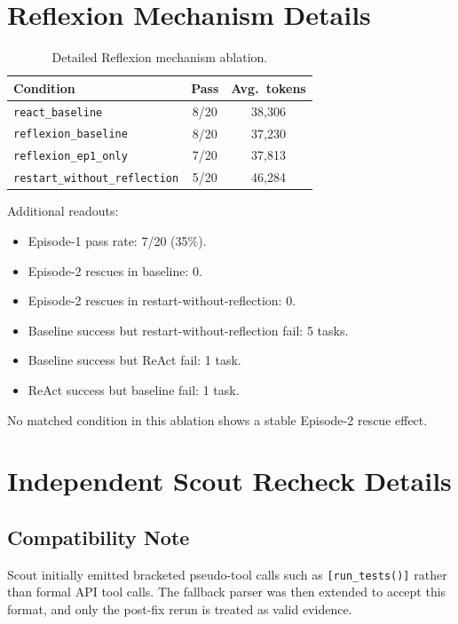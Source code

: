 \documentclass{article}
\begin{document}
\section{Reflexion Mechanism Details}

\begin{table}[H]
\centering
\caption{Detailed Reflexion mechanism ablation.}
\label{tab:ablationdetail}
\begin{tabular}{lcc}
\toprule
Condition & Pass & Avg.\ tokens \\
\midrule
\texttt{react\_baseline} & 8/20 & 38{,}306 \\
\texttt{reflexion\_baseline} & 8/20 & 37{,}230 \\
\texttt{reflexion\_ep1\_only} & 7/20 & 37{,}813 \\
\texttt{restart\_without\_reflection} & 5/20 & 46{,}284 \\
\bottomrule
\end{tabular}
\end{table}

Additional readouts:
\begin{itemize}
    \item Episode-1 pass rate: 7/20 (35\%).
    \item Episode-2 rescues in baseline: 0.
    \item Episode-2 rescues in restart-without-reflection: 0.
    \item Baseline success but restart-without-reflection fail: 5 tasks.
    \item Baseline success but ReAct fail: 1 task.
    \item ReAct success but baseline fail: 1 task.
\end{itemize}

No matched condition in this ablation shows a stable Episode-2 rescue effect.

\section{Independent Scout Recheck Details}

\subsection{Compatibility Note}

Scout initially emitted bracketed pseudo-tool calls such as \texttt{[run\_tests()]} rather than formal API tool calls. The fallback parser was then extended to accept this format, and only the post-fix rerun is treated as valid evidence.
\end{document}
